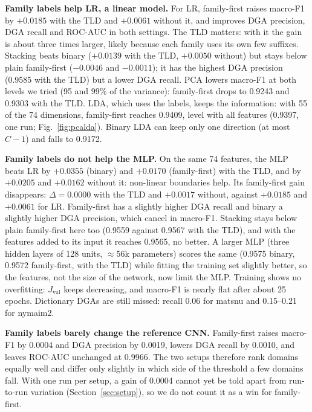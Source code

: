 \documentclass[11pt]{article}
\begin{document}
\textbf{Family labels help LR, a linear model.} For LR, family-first raises
macro-F1 by $+0.0185$ with the TLD and $+0.0061$ without it, and improves DGA
precision, DGA recall and ROC-AUC in both settings. The TLD matters: with it the
gain is about three times larger, likely because each family uses
its own few suffixes. Stacking beats binary ($+0.0139$ with the TLD, $+0.0050$ without) but stays below
plain family-first ($-0.0046$ and $-0.0011$); it has the highest DGA precision
(0.9585 with the TLD) but a lower DGA recall. PCA lowers macro-F1 at both
levels we tried (95 and 99\% of the variance): family-first drops to 0.9243 and
0.9303 with the TLD. LDA, which uses the labels, keeps the information: with 55
of the 74 dimensions, family-first reaches 0.9409, level with all features
(0.9397, one run; Fig.~\ref{fig:pcalda}). Binary LDA can keep only one direction (at most $C-1$) and
falls to 0.9172.

\textbf{Family labels do not help the MLP.} On the same 74 features, the MLP beats
LR by $+0.0355$ (binary) and $+0.0170$ (family-first) with the TLD, and by $+0.0205$
and $+0.0162$ without it: non-linear boundaries help. Its family-first gain
disappears: $\Delta = 0.0000$ with the TLD and $+0.0017$ without, against $+0.0185$
and $+0.0061$ for LR. Family-first has a slightly higher DGA recall and binary a
slightly higher DGA precision, which cancel in macro-F1. Stacking stays below plain
family-first here too (0.9559 against 0.9567 with the TLD), and with the features
added to its input it reaches 0.9565, no better. A larger MLP (three hidden layers
of 128 units, $\approx$56k parameters) scores the same (0.9575 binary, 0.9572
family-first, with the TLD) while fitting the training set slightly better, so the
features, not the size of the network, now limit the MLP. Training shows no
overfitting: $J_{\text{val}}$ keeps decreasing, and macro-F1 is nearly flat after
about 25 epochs. Dictionary DGAs are still missed: recall 0.06 for matsnu and
0.15--0.21 for nymaim2.

\textbf{Family labels barely change the reference CNN.} Family-first raises
macro-F1 by 0.0004 and DGA precision by 0.0019, lowers DGA recall by 0.0010, and
leaves ROC-AUC unchanged at 0.9966. The two setups therefore rank domains equally
well and differ only slightly in which side of the threshold a few domains fall.
With one run per setup, a gain of 0.0004 cannot yet be told apart from
run-to-run variation (Section~\ref{sec:setup}), so we do not count it as a win for
family-first.
\end{document}
